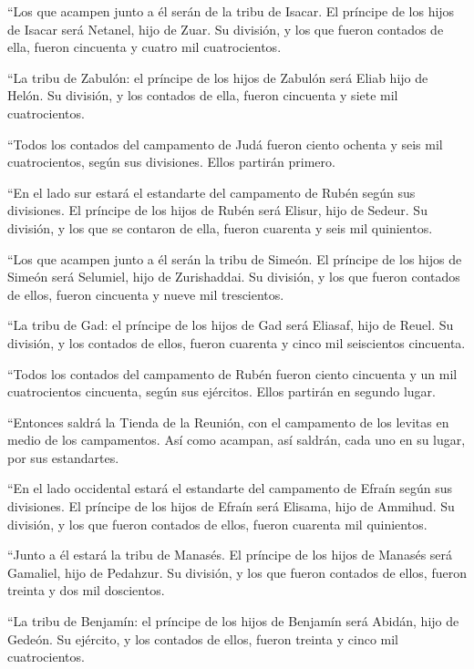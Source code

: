  ``Los que acampen junto a él serán de la tribu de Isacar.
El príncipe de los hijos de Isacar será Netanel, hijo de Zuar.
 Su división, y los que fueron contados de ella, fueron
cincuenta y cuatro mil cuatrocientos.

 ``La tribu de Zabulón: el príncipe de los hijos de
Zabulón será Eliab hijo de Helón.  Su división, y los
contados de ella, fueron cincuenta y siete mil cuatrocientos.

 ``Todos los contados del campamento de Judá fueron ciento
ochenta y seis mil cuatrocientos, según sus divisiones. Ellos partirán
primero.

 ``En el lado sur estará el estandarte del campamento de
Rubén según sus divisiones. El príncipe de los hijos de Rubén será
Elisur, hijo de Sedeur.  Su división, y los que se
contaron de ella, fueron cuarenta y seis mil quinientos.

 ``Los que acampen junto a él serán la tribu de Simeón.
El príncipe de los hijos de Simeón será Selumiel, hijo de Zurishaddai.
 Su división, y los que fueron contados de ellos, fueron
cincuenta y nueve mil trescientos.

 ``La tribu de Gad: el príncipe de los hijos de Gad será
Eliasaf, hijo de Reuel.  Su división, y los contados de
ellos, fueron cuarenta y cinco mil seiscientos cincuenta.

 ``Todos los contados del campamento de Rubén fueron
ciento cincuenta y un mil cuatrocientos cincuenta, según sus ejércitos.
Ellos partirán en segundo lugar.

 ``Entonces saldrá la Tienda de la Reunión, con el
campamento de los levitas en medio de los campamentos. Así como acampan,
así saldrán, cada uno en su lugar, por sus estandartes.

 ``En el lado occidental estará el estandarte del
campamento de Efraín según sus divisiones. El príncipe de los hijos de
Efraín será Elisama, hijo de Ammihud.  Su división, y los
que fueron contados de ellos, fueron cuarenta mil quinientos.

 ``Junto a él estará la tribu de Manasés. El príncipe de
los hijos de Manasés será Gamaliel, hijo de Pedahzur.  Su
división, y los que fueron contados de ellos, fueron treinta y dos mil
doscientos.

 ``La tribu de Benjamín: el príncipe de los hijos de
Benjamín será Abidán, hijo de Gedeón.  Su ejército, y los
contados de ellos, fueron treinta y cinco mil cuatrocientos.

